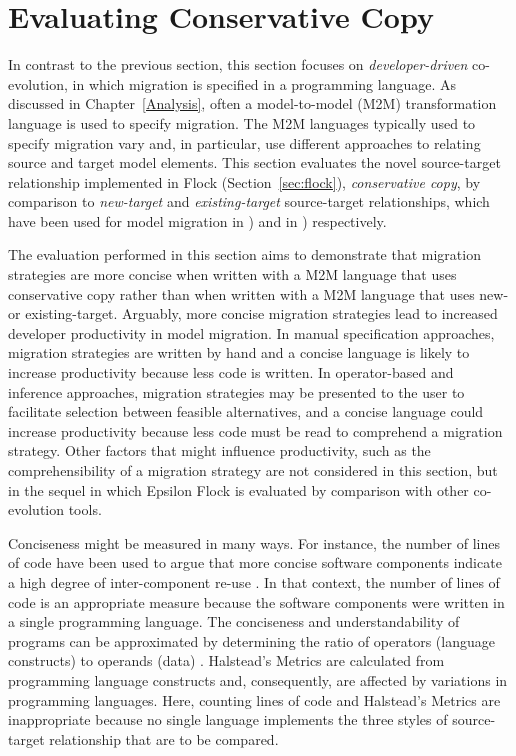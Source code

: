 
\section{Evaluating Conservative Copy}
\label{sec:quantitive}
In contrast to the previous section, this section focuses on \emph{developer-driven} co-evolution, in which migration is specified in a programming language. As discussed in Chapter~\ref{Analysis}, often a model-to-model (M2M) transformation language is used to specify migration. The M2M languages typically used to specify migration vary and, in particular, use different approaches to relating source and target model elements. This section evaluates the novel source-target relationship implemented in Flock (Section~\ref{sec:flock}), \emph{conservative copy}, by comparison to \emph{new-target} and \emph{existing-target} source-target relationships, which have been used for model migration in \cite{cicchetti08automating,garces09managing}) and in \cite{herrmannsdoerfer09cope,hussey06advanced}) respectively.

The evaluation performed in this section aims to demonstrate that migration strategies are more concise when written with a M2M language that uses conservative copy rather than when written with a M2M language that uses new- or existing-target. Arguably, more concise migration strategies lead to increased developer productivity in model migration. In manual specification approaches, migration strategies are written by hand and a concise language is likely to increase productivity because less code is written. In operator-based and inference approaches, migration strategies may be presented to the user to facilitate selection between feasible alternatives, and a concise language could increase productivity because less code must be read to comprehend a migration strategy. Other factors that might influence productivity, such as the comprehensibility of a migration strategy are not considered in this section, but in the sequel in which Epsilon Flock is evaluated by comparison with other co-evolution tools.

Conciseness might be measured in many ways. For \cc instance, the number of lines of code have been used to argue that more concise software components indicate a high degree of inter-component re-use \cite{kolovos09thesis}. In that context, the number of lines of code is an appropriate measure because the software components were written in a single programming language. The \cc conciseness and understandability of programs can be approximated by determining the ratio of operators (language constructs) to operands (data) \cite{halstead77softwarescience}. Halstead's Metrics are calculated from programming language constructs and, consequently, are affected by variations in programming languages. Here, counting lines of code and Halstead's Metrics are inappropriate because no single language implements the three styles of source-target relationship that are to be compared.

